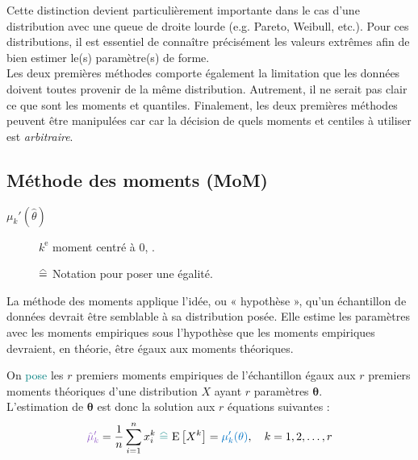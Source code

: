 \documentclass[10pt, french]{article}
\begin{document}
\begin{multicols*}{2}
Cette distinction devient particulièrement importante dans le cas d'une distribution avec une queue de droite lourde (e.g. Pareto, Weibull, etc.). Pour ces distributions, il est essentiel de connaître  précisément les valeurs extrêmes afin de bien estimer le(s) paramètre(s) de forme.	\\

Les deux premières méthodes comporte également la limitation que les données doivent toutes provenir de la même distribution. Autrement, il ne serait pas clair ce que sont les moments et quantiles. Finalement, les deux premières méthodes peuvent être manipulées car car la décision de quels moments et centiles à utiliser est \textit{arbitraire}.



\columnbreak
\subsection{Méthode des moments (MoM)}
\begin{distributions}[Terminologie]
\begin{description}
	\item[$\mu_{k}'(\hat{\theta})$]	$k^{\text{e}}$ moment centré à 0, .
	\item[]	$\equalhat$	Notation pour poser une égalité.
\end{description}
\end{distributions}


\begin{definitionNOHFILL}
\begin{rappel_enhanced}[Contexte]
La méthode des moments applique l'idée, ou « hypothèse », qu'un échantillon de données devrait être semblable à sa distribution posée. Elle estime les paramètres avec les moments empiriques sous l'hypothèse que les moments empiriques devraient, en théorie, être égaux aux moments théoriques.
\end{rappel_enhanced}

On \textcolor{teal}{pose} les $r$ premiers \textcolor{amethyst}{moments empiriques} de l'échantillon égaux aux $r$ premiers \textcolor{trueblue}{moments théoriques} d'une distribution $X$ ayant $r$ paramètres $\bm{\theta}$. \\

L'estimation de $\bm{\theta}$ est donc la solution aux $r$ équations suivantes : 
\begin{equation*}
	\textcolor{amethyst}{\hat{\mu}_{k}'} 
	=	\frac{1}{n}\sum_{i = 1}^{n} x_{i}^{k}\
	\textcolor{teal}{\equalhat}\	\esp{X^{k}}
	=	\textcolor{trueblue}{\mu_{k}'(\theta)}, \quad	k = 1, 2, \dots, r
\end{equation*}
\end{definitionNOHFILL}


\end{multicols*}
\end{document}
